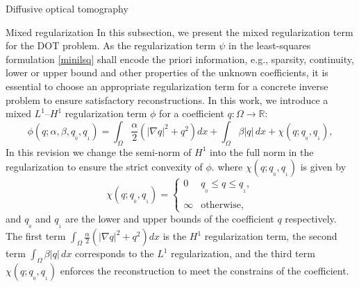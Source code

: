 \documentclass[11pt]{article}%
\renewcommand{\_}{{\fontfamily{ptm}\selectfont\textunderscore}}
\theoremstyle{plain}
\numberwithin{equation}{section}
\begin{document}
\begin{section}{Diffusive optical tomography}
\begin{subsection}{Mixed regularization}
In this subsection, we present the mixed regularization term for the DOT problem.
As the regularization term $\psi$ in the least-squares formulation \eqref{minilsq} shall encode the priori information, e.g., sparsity, continuity, lower or upper bound and other properties of the unknown coefficients, it is essential to choose an appropriate regularization term for a concrete inverse problem to ensure satisfactory reconstructions. 
In this work, we introduce a mixed $L^1$--$H^1$ regularization term $\phi$ for a coefficient $q:\Omega\to \mathbb{R}$:
\begin{equation}\label{reg}
\phi(q; \alpha, \beta, q_{_0}, {q_{_1}})=\int_\Omega \frac{\alpha}{2}(|\nabla q|^2+q^2)dx+
\int_\Omega\beta|q|\,dx+\chi(q; q_{_0}, q_{_1}),
\end{equation}
In this revision we change the semi-norm of $H^1$ into the full norm in the regularization to ensure the strict convexity of $\phi$.
where $\chi(q; q_{_0}, q_{_1})$ is given by 
\begin{equation*}
\chi(q; q_{_0}, q_{_1})=
\left\{
\begin{array}{cc} 0 & {q_{_0}}\le q\le q_{_1}, \\ \\ 
\infty & \mbox{otherwise,}\end{array}
 \right.
\end{equation*}
and $q_{_0}$ and $q_{_1}$ are the {lower and upper} bounds of the coefficient $q$ respectively.  The first term $\int_\Omega \frac{\alpha}{2}(|\nabla q|^2+q^2)dx$ is the $H^1$ regularization term, the second term $\int_\Omega\beta|q|\,dx$ corresponds to the $L^1$ regularization, and the third term  $\chi(q; q_{_0},q_{_1})$ enforces the reconstruction to meet the constrains of the coefficient.


\end{subsection}
\end{section}
\end{document}
